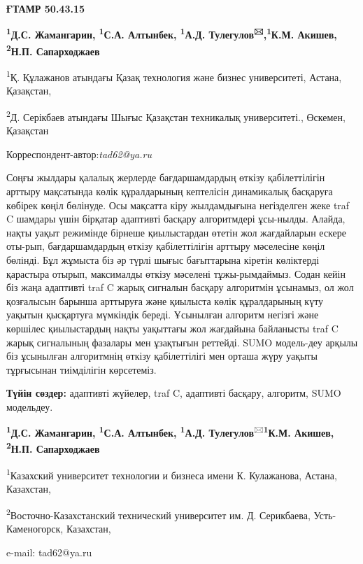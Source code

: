 \newpage
{\bfseries ҒТАМР 50.43.15}


\begin{center}

{\bfseries \textsuperscript{1}Д.С. Жамангарин, \textsuperscript{1}С.А.
Алтынбек, \textsuperscript{1}А.Д. Тулегулов\textsuperscript{🖂},\bfseries \textsuperscript{1}К.М. Акишев, \textsuperscript{2}Н.П.
Сапарходжаев}

\textsuperscript{1}Қ. Құлажанов атындағы Қазақ технология және бизнес
университеті, Астана, Қазақстан,

\textsuperscript{2}Д. Серікбаев атындағы Шығыс Қазақстан техникалық
университеті., Өскемен, Қазақстан
\end{center}
Корреспондент-автор:\emph{tad62@ya.ru}\vspace{0.5cm}

Соңғы жылдары қалалық жерлерде бағдаршамдардың өткізу қабілеттілігін
арттыру мақсатында көлік құралдарының кептелісін динамикалық басқаруға
көбірек көңіл бөлінуде. Осы мақсатта кіру жылдамдығына негізделген жеке
traf C шамдары үшін бірқатар адаптивті басқару алгоритмдері ұсы-нылды.
Алайда, нақты уақыт режимінде бірнеше қиылыстардан өтетін жол
жағдайларын ескере оты-рып, бағдаршамдардың өткізу қабілеттілігін арттыру
мәселесіне көңіл бөлінді. Бұл жұмыста біз әр түрлі шығыс бағыттарына
кіретін көліктерді қарастыра отырып, максималды өткізу мәселені
тұжы-рымдаймыз. Содан кейін біз жаңа адаптивті traf C жарық сигналын
басқару алгоритмін ұсынамыз, ол жол қозғалысын барынша арттыруға және
қиылыста көлік құралдарының күту уақытын қысқартуға мүмкіндік береді.
Ұсынылған алгоритм негізгі және көршілес қиылыстардың нақты уақыттағы
жол жағдайына байланысты traf C жарық сигналының фазалары мен ұзақтығын
реттейді. SUMO модель-деу арқылы біз ұсынылған алгоритмнің өткізу
қабілеттілігі мен орташа жүру уақыты тұрғысынан тиімділігін көрсетеміз.

{\bfseries Түйін сөздер:} адаптивті жүйелер, traf C, адаптивті басқару,
алгоритм, SUMO модельдеу.



\begin{center}
{\bfseries \textsuperscript{1}Д.С. Жамангарин, \textsuperscript{1}С.А.
Алтынбек, \textsuperscript{1}А.Д.
Тулегулов}\textsuperscript{🖂}{\bfseries \textsuperscript{1}К.М. Акишев, \textsuperscript{2}Н.П.
Сапарходжаев}

\textsuperscript{1}Казахский университет технологии и бизнеса имени К.
Кулажанова, Астана, Казахстан,

\textsuperscript{2}Восточно-Казахстанский технический университет им. Д.
Серикбаева, Усть-Каменогорск, Казахстан,

e-mail: tad62@ya.ru
\end{center}

